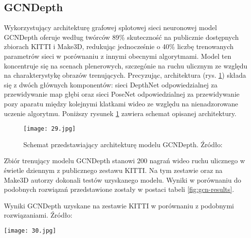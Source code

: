 \subsection{GCNDepth}
Wykorzystujący architekturę grafowej splotowej sieci neuronowej \cite{GNNBook2022} model GCNDepth \cite{masoumian2021gcndepth} oferuje według twórców 89\% skuteczność na publicznie dostępnych zbiorach KITTI i Make3D, redukując jednocześnie o 40\% liczbę trenowanych parametrów sieci w porównaniu z innymi obecnymi algorytmami. Model ten koncentruje się na scenach plenerowych, szczegónie na ruchu ulicznym ze względu na charakterystykę obrazów trenujących. Precyzując, architektura (rys. \ref{fig:gcn-schema}) składa się z dwóch głównych komponentów: sieci DepthNet odpowiedzialnej za przewidywanie map głębi oraz sieci PoseNet odpowiedzialnej za przewidywanie pozy aparatu między kolejnymi klatkami wideo ze względu na nienadzorowane uczenie algorytmu. Poniższy rysunek \ref{fig:gcn-schema} zawiera schemat opisanej architektury.
\begin{figure}[H]
    \centering
    \texttt{[image: 29.jpg]}
    \caption{Schemat przedstawiający architekturę modelu GCNDepth. Źródło: \cite{GNNBook2022}}
    \label{fig:gcn-schema}
\end{figure}
Zbiór trenujący modelu GCNDepth stanowi 200 nagrań wideo ruchu ulicznego w świetle dziennym z publicznego zestawu KITTI. Na tym zestawie oraz na Make3D autorzy dokonali testów uzyskanego modelu. Wyniki w porównaniu do podobnych rozwiązań przedstawione zostały w postaci tabeli \ref{fig:gcn-results}.
\begin{table}[H]
    \centering
    \caption{Wyniki GCNDepth uzyskane na zestawie KITTI w porównaniu z podobnymi rozwiązaniami. Źródło: \cite{GNNBook2022}}
    \texttt{[image: 30.jpg]}
    \label{fig:gcn-results}
\end{table}


